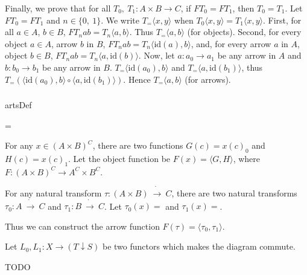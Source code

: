 \documentclass{article}
\newcounter{artCounter}
\newcounter{maxArts}
\newcommand{\showArt}{
\csname artsDef\roman{artCounter}\endcsname
\addtocounter{artCounter}{1}
\ifnum \value{artCounter}=\value{maxArts}
\setcounter{artCounter}{0}
\fi
}
\begin{document}
Finally, we prove that for all $T_0,\ T_1 : A \times B \rightarrow C$, if $FT_0 = FT_1$, then $T_0 = T_1$. Let $FT_0 = FT_1$ and $n \in \{0,\ 1\}$. We write $T_=\langle x, y \rangle$ when $T_0\langle x, y \rangle = T_1\langle x, y \rangle$. First, for all $a \in A$, $b \in B$, $FT_nab = T_n\langle a, b \rangle$. Thus $T_=\langle a, b \rangle$ (for objects). Second, for every object $a \in A$, arrow $b$ in $B$, $FT_nab = T_n\langle \mathrm{id}(a), b \rangle$, and, for every arrow $a$ in $A$, object $b \in B$, $FT_nab = T_n\langle a, \mathrm{id}(b) \rangle$. Now, let $a : a_0 \rightarrow a_1$ be any arrow in $A$ and $b : b_0 \rightarrow b_1$ be any arrow in $B$. $T_=\langle \mathrm{id}(a_0), b \rangle$ and $T_=\langle a, \mathrm{id}(b_1)\rangle$, thus $T_=(\langle \mathrm{id}(a_0), b \rangle \circ \langle a, \mathrm{id}(b_1) \rangle)$. Hence $T_=\langle a, b \rangle$ (for arrows).

\subsubsection{}

\showArt

For any $x \in (A \times B)^C$, there are two functions $G(c) = x(c)_0$ and $H(c) = x(c)_1$. Let the object function be $F(x) = \langle G, H \rangle$, where $F : (A \times B)^C \rightarrow A^C \times B^C$.

For any natural transform $\tau : (A \times B)\ \dot{\rightarrow}\ C$, there are two natural transforms $\tau_0 : A\ \dot{\rightarrow}\ C$ and $\tau_1 : B\ \dot{\rightarrow}\ C$. Let $\tau_0(x) = $ and $\tau_1(x) = $.

Thus we can construct the arrow function $F(\tau) = \langle \tau_0, \tau_1 \rangle$.

Let $L_0, L_1 : X \rightarrow (T \downarrow S)$ be two functors which makes the diagram commute.

TODO

\subsubsection{}

\subsubsection{}

\subsubsection{}
\end{document}
